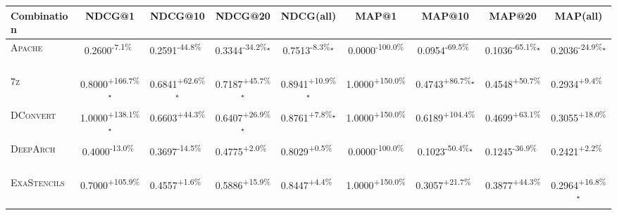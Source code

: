 \begin{table}[htbp]
\centering
\renewcommand{\arraystretch}{1.2}
\begin{tabular}{l|cccc|cccc}
\hline
Combination & NDCG@1 & NDCG@10 & NDCG@20 & NDCG(all) & MAP@1 & MAP@10 & MAP@20 & MAP(all) \\ \hline
\textsc{Apache} & \cellcolor{red!30}0.2600\textsuperscript{-7.1\%}$^{\,\,\,}$ & \cellcolor{red!30}0.2591\textsuperscript{-44.8\%}$^{\,\,\,}$ & \cellcolor{red!30}0.3344\textsuperscript{-34.2\%}$^\star$ & \cellcolor{red!30}0.7513\textsuperscript{-8.3\%}$^\star$ & \cellcolor{red!30}0.0000\textsuperscript{-100.0\%}$^{\,\,\,}$ & \cellcolor{red!30}0.0954\textsuperscript{-69.5\%}$^{\,\,\,}$ & \cellcolor{red!30}0.1036\textsuperscript{-65.1\%}$^\star$ & \cellcolor{red!30}0.2036\textsuperscript{-24.9\%}$^\star$ \\
\textsc{7z} & \cellcolor{green!30}0.8000\textsuperscript{+166.7\%}$^\star$ & \cellcolor{green!30}0.6841\textsuperscript{+62.6\%}$^\star$ & \cellcolor{green!30}0.7187\textsuperscript{+45.7\%}$^\star$ & \cellcolor{green!30}0.8941\textsuperscript{+10.9\%}$^\star$ & \cellcolor{green!30}1.0000\textsuperscript{+150.0\%}$^{\,\,\,}$ & \cellcolor{green!30}0.4743\textsuperscript{+86.7\%}$^\star$ & \cellcolor{green!30}0.4548\textsuperscript{+50.7\%}$^{\,\,\,}$ & \cellcolor{green!30}0.2934\textsuperscript{+9.4\%}$^{\,\,\,}$ \\
\textsc{DConvert} & \cellcolor{green!30}1.0000\textsuperscript{+138.1\%}$^\star$ & \cellcolor{green!30}0.6603\textsuperscript{+44.3\%}$^{\,\,\,}$ & \cellcolor{green!30}0.6407\textsuperscript{+26.9\%}$^\star$ & \cellcolor{green!30}0.8761\textsuperscript{+7.8\%}$^\star$ & \cellcolor{green!30}1.0000\textsuperscript{+150.0\%}$^{\,\,\,}$ & \cellcolor{green!30}0.6189\textsuperscript{+104.4\%}$^{\,\,\,}$ & \cellcolor{green!30}0.4699\textsuperscript{+63.1\%}$^{\,\,\,}$ & \cellcolor{green!30}0.3055\textsuperscript{+18.0\%}$^{\,\,\,}$ \\
\textsc{DeepArch} & \cellcolor{red!30}0.4000\textsuperscript{-13.0\%}$^{\,\,\,}$ & \cellcolor{red!30}0.3697\textsuperscript{-14.5\%}$^{\,\,\,}$ & \cellcolor{green!30}0.4775\textsuperscript{+2.0\%}$^{\,\,\,}$ & \cellcolor{green!30}0.8029\textsuperscript{+0.5\%}$^{\,\,\,}$ & \cellcolor{red!30}0.0000\textsuperscript{-100.0\%}$^{\,\,\,}$ & \cellcolor{red!30}0.1023\textsuperscript{-50.4\%}$^\star$ & \cellcolor{red!30}0.1245\textsuperscript{-36.9\%}$^{\,\,\,}$ & \cellcolor{green!30}0.2421\textsuperscript{+2.2\%}$^{\,\,\,}$ \\
\textsc{ExaStencils} & \cellcolor{green!30}0.7000\textsuperscript{+105.9\%}$^{\,\,\,}$ & \cellcolor{green!30}0.4557\textsuperscript{+1.6\%}$^{\,\,\,}$ & \cellcolor{green!30}0.5886\textsuperscript{+15.9\%}$^{\,\,\,}$ & \cellcolor{green!30}0.8447\textsuperscript{+4.4\%}$^{\,\,\,}$ & \cellcolor{green!30}1.0000\textsuperscript{+150.0\%}$^{\,\,\,}$ & \cellcolor{green!30}0.3057\textsuperscript{+21.7\%}$^{\,\,\,}$ & \cellcolor{green!30}0.3877\textsuperscript{+44.3\%}$^{\,\,\,}$ & \cellcolor{green!30}0.2964\textsuperscript{+16.8\%}$^\star$ \\

\end{tabular}
\end{table}
